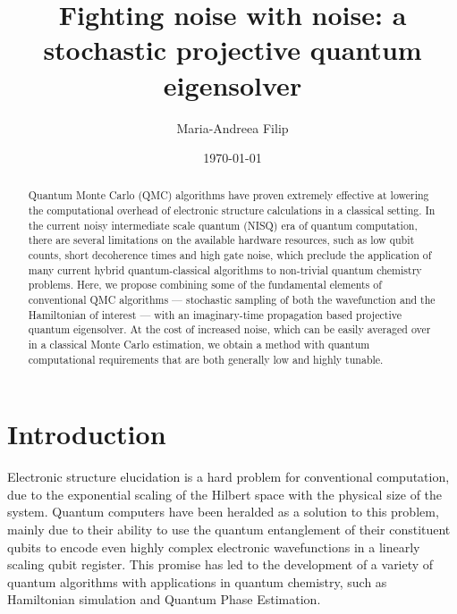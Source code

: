 \documentclass[%
 reprint,
 amsmath,amssymb,
 aps,
]{revtex4-2}
\begin{document}
\title{Fighting noise with noise: a stochastic projective quantum eigensolver}
\author{Maria-Andreea Filip}  

% 
% 
\date{\today}%

\begin{abstract}
Quantum Monte Carlo (QMC) algorithms have proven extremely effective at lowering the computational overhead of electronic structure calculations in a classical setting. In the current noisy intermediate scale quantum (NISQ) era of quantum computation, there are several limitations on the available hardware resources, such as low qubit counts, short decoherence times and high gate noise, which preclude the application of many current hybrid quantum-classical algorithms to non-trivial quantum chemistry problems. Here, we propose combining some of the fundamental elements of conventional QMC algorithms --- stochastic sampling of both the wavefunction and the Hamiltonian of interest --- with an imaginary-time propagation based projective quantum eigensolver. At the cost of increased noise, which can be easily averaged over in a classical Monte Carlo estimation, we obtain a method with quantum computational requirements that are both generally low and highly tunable.
\end{abstract}
\maketitle

\section{Introduction}
Electronic structure elucidation is a hard problem for conventional computation, due to the exponential scaling of the Hilbert space with the physical size of the system. Quantum computers have been heralded as a solution to this problem,\cite{Feynman1982, Aspuru-Guzik2005} mainly due to their ability to use the quantum entanglement of their constituent qubits to encode even highly complex electronic wavefunctions in a linearly scaling qubit register. This promise has led to the development of a variety of quantum algorithms with applications in quantum chemistry, such as Hamiltonian simulation\cite{Berry2007, Berry2015, Low2017, Childs2018} and Quantum Phase Estimation.\cite{Abrams1997, Abrams1999}
\end{document}
